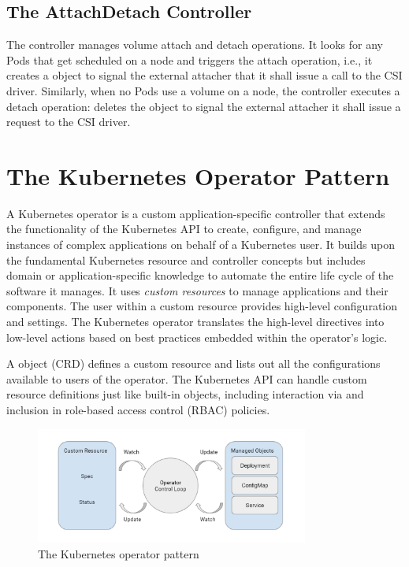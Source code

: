 \subsection{The AttachDetach Controller}

The  controller manages volume attach and detach operations. It
looks for any Pods that get scheduled on a node and triggers the attach
operation, i.e., it creates a  object to signal the
external attacher that it shall issue a  call to the CSI
driver. Similarly, when no Pods use a volume on a node, the controller executes
a detach operation: deletes the  object to signal the external
attacher it shall issue a  request to the CSI driver.




\section{The Kubernetes Operator Pattern}
\label{section:operator-pattern}

A Kubernetes operator is a custom application-specific controller that extends
the functionality of the Kubernetes API to create, configure, and manage
instances of complex applications on behalf of a Kubernetes user. It builds upon
the fundamental Kubernetes resource and controller concepts but includes domain
or application-specific knowledge to automate the entire life cycle of the
software it manages. It uses \textit{custom resources} to manage applications
and their components. The user within a custom resource provides high-level
configuration and settings. The Kubernetes operator translates the high-level
directives into low-level actions based on best practices embedded within the
operator's logic.

A  object (CRD) defines a custom resource and lists
out all the configurations available to users of the operator. The Kubernetes
API can handle custom resource definitions just like built-in objects, including
interaction via  and inclusion in role-based access control (RBAC)
policies.

\begin{figure}[ht]
	\centering
	\includegraphics[width=0.8\textwidth]{resources/operator.png}
	\caption{The Kubernetes operator pattern}
\end{figure}
